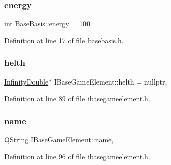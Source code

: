 \mbox{\label{a00149_a59708d348b0218ba9f91c02361524963}} 
\subsubsection{\texorpdfstring{energy}{energy}}
{\footnotesize\ttfamily int Base\+Basis\+::energy = 100\hspace{0.3cm}{\ttfamily [protected]}}



Definition at line \hyperlink{a00029_source_l00017}{17} of file \hyperlink{a00029_source}{basebasis.\+h}.

\mbox{\label{a00137_a440cf9e7d61c33482ab256a6e944b34d}} 
\subsubsection{\texorpdfstring{helth}{helth}}
{\footnotesize\ttfamily \hyperlink{a00161}{Infinity\+Double}$\ast$ I\+Base\+Game\+Element\+::helth = nullptr\hspace{0.3cm}{\ttfamily [protected]}, {\ttfamily [inherited]}}



Definition at line \hyperlink{a00047_source_l00089}{89} of file \hyperlink{a00047_source}{ibasegameelement.\+h}.

\mbox{\label{a00137_af35fba4ed599605c3d78b3c3a71fa467}} 
\subsubsection{\texorpdfstring{name}{name}}
{\footnotesize\ttfamily Q\+String I\+Base\+Game\+Element\+::name\hspace{0.3cm}{\ttfamily [protected]}, {\ttfamily [inherited]}}



Definition at line \hyperlink{a00047_source_l00096}{96} of file \hyperlink{a00047_source}{ibasegameelement.\+h}.

\mbox{\label{a00137_afe080b1942ec40832e94cb884ec87456}} 
